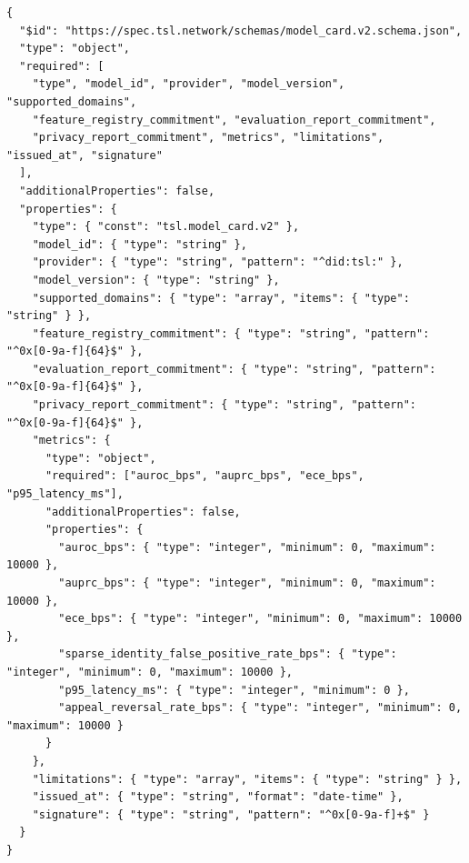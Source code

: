 \documentclass[11pt]{article}
\begin{document}
\begin{lstlisting}[style=tslcode]
{
  "$id": "https://spec.tsl.network/schemas/model_card.v2.schema.json",
  "type": "object",
  "required": [
    "type", "model_id", "provider", "model_version", "supported_domains",
    "feature_registry_commitment", "evaluation_report_commitment",
    "privacy_report_commitment", "metrics", "limitations", "issued_at", "signature"
  ],
  "additionalProperties": false,
  "properties": {
    "type": { "const": "tsl.model_card.v2" },
    "model_id": { "type": "string" },
    "provider": { "type": "string", "pattern": "^did:tsl:" },
    "model_version": { "type": "string" },
    "supported_domains": { "type": "array", "items": { "type": "string" } },
    "feature_registry_commitment": { "type": "string", "pattern": "^0x[0-9a-f]{64}$" },
    "evaluation_report_commitment": { "type": "string", "pattern": "^0x[0-9a-f]{64}$" },
    "privacy_report_commitment": { "type": "string", "pattern": "^0x[0-9a-f]{64}$" },
    "metrics": {
      "type": "object",
      "required": ["auroc_bps", "auprc_bps", "ece_bps", "p95_latency_ms"],
      "additionalProperties": false,
      "properties": {
        "auroc_bps": { "type": "integer", "minimum": 0, "maximum": 10000 },
        "auprc_bps": { "type": "integer", "minimum": 0, "maximum": 10000 },
        "ece_bps": { "type": "integer", "minimum": 0, "maximum": 10000 },
        "sparse_identity_false_positive_rate_bps": { "type": "integer", "minimum": 0, "maximum": 10000 },
        "p95_latency_ms": { "type": "integer", "minimum": 0 },
        "appeal_reversal_rate_bps": { "type": "integer", "minimum": 0, "maximum": 10000 }
      }
    },
    "limitations": { "type": "array", "items": { "type": "string" } },
    "issued_at": { "type": "string", "format": "date-time" },
    "signature": { "type": "string", "pattern": "^0x[0-9a-f]+$" }
  }
}


\end{lstlisting}
\end{document}
